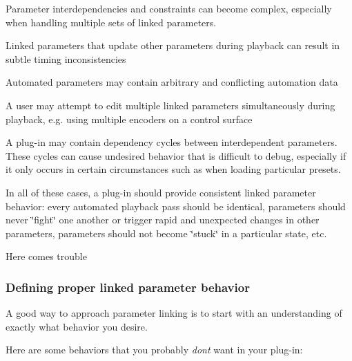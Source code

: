 \begin{DoxyItemize}
\item Parameter interdependencies and constraints can become complex, especially when handling multiple sets of linked parameters.
\item Linked parameters that update other parameters during playback can result in subtle timing inconsistencies
\item Automated parameters may contain arbitrary and conflicting automation data
\item A user may attempt to edit multiple linked parameters simultaneously during playback, e.\+g. using multiple encoders on a control surface
\item A plug-\/in may contain dependency cycles between interdependent parameters. These cycles can cause undesired behavior that is difficult to debug, especially if it only occurs in certain circumstances such as when loading particular presets.
\end{DoxyItemize}

In all of these cases, a plug-\/in should provide consistent linked parameter behavior\+: every automated playback pass should be identical, parameters should never \char`\"{}fight\char`\"{} one another or trigger rapid and unexpected changes in other parameters, parameters should not become \char`\"{}stuck\char`\"{} in a particular state, etc.

 Here comes trouble\hypertarget{a00354_linkedParameters_behavior}{}\subsubsection{Defining proper linked parameter behavior}\label{a00354_linkedParameters_behavior}
A good way to approach parameter linking is to start with an understanding of exactly what behavior you desire.

Here are some behaviors that you probably {\itshape don\textquotesingle{}t} want in your plug-\/in\+:


